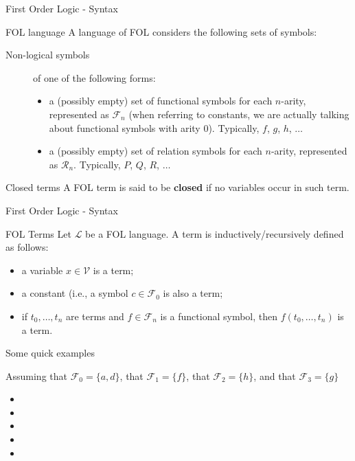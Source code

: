 \documentclass[aspectratio=169]{beamer}
\begin{document}
\begin{slide}{First Order Logic - Syntax}  

  \begin{block}{FOL language}  
    A language of FOL considers the following sets of symbols:
    \begin{description}
    \item [Non-logical symbols] of one of the following forms:
      \begin{itemize}
      \item a (possibly empty) set of functional symbols for each $n$-arity, represented as $\mathcal{F}_n$ (when referring to constants, we are actually talking about functional symbols with arity $0$). Typically, $f$, $g$, $h$, $\ldots$
      \item a (possibly empty) set of relation symbols for each $n$-arity, represented as $\mathcal{R}_n$. Typically, $P$, $Q$, $R$, $\ldots$
      \end{itemize}
    \end{description}
  \end{block}
  
  \begin{block}{Closed terms}
    A FOL term is said to be {\bf closed} if no variables occur in such term.
  \end{block}


\end{slide}

\begin{slide}{First Order Logic - Syntax}
  \begin{block}{FOL Terms}  
  Let $\mathcal{L}$ be a FOL language. A term is inductively/recursively defined as follows:
  \begin{itemize}
  \item a variable $x \in \mathcal{V}$ is a term;
  \item a constant (i.e., a symbol $c \in \mathcal{F}_0$ is also a term;
  \item if $t_0,\ldots,t_n$ are terms and $f \in \mathcal{F}_n$ is a functional symbol, then $f(t_0,\ldots,t_n)$ is a term.  
  \end{itemize}
  \end{block}

\end{slide}

\begin{slide}{Some quick examples}

Assuming that $\mathcal{F}_0 = \{a,d\}$, that $\mathcal{F}_1 = \{f\}$, that $\mathcal{F}_2 = \{h\}$, and that $\mathcal{F}_3 = \{g\}$

\begin{itemize}
\item {}
\item {}
\item {}
\item {}
\item {}
\end{itemize}

\end{slide}
\end{document}
